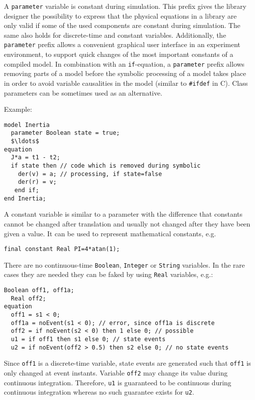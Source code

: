 \begin{nonnormative}
A \lstinline!parameter! variable is constant during simulation.
This prefix gives the library designer the possibility to express that the physical equations in a library are only valid if some of the used components are constant during simulation.
The same also holds for discrete-time and constant variables.
Additionally, the \lstinline!parameter! prefix allows a convenient graphical user interface in an experiment environment, to support quick changes of the most important constants of a compiled model.
In combination with an \lstinline!if!-equation, a \lstinline!parameter! prefix allows removing parts of a model before the symbolic processing of a model takes place in order to avoid variable causalities in the model (similar to \lstinline!#ifdef! in C).
Class parameters can be sometimes used as an alternative.

Example:
\begin{lstlisting}[language=modelica]
model Inertia
  parameter Boolean state = true;
  $\ldots$
equation
  J*a = t1 - t2;
  if state then // code which is removed during symbolic
    der(v) = a; // processing, if state=false
    der(r) = v;
   end if;
end Inertia;
\end{lstlisting}

A constant variable is similar to a parameter with the difference
that constants cannot be changed after translation and usually not
changed after they have been given a value. It can be used to represent
mathematical constants, e.g.
\begin{lstlisting}[language=modelica]
final constant Real PI=4*atan(1);
\end{lstlisting}

There are no continuous-time \lstinline!Boolean!, \lstinline!Integer! or \lstinline!String!
variables. In the rare cases they are needed they can be
faked by using \lstinline!Real! variables, e.g.:
\begin{lstlisting}[language=modelica]
  Boolean off1, off1a;
  Real off2;
equation
  off1 = s1 < 0;
  off1a = noEvent(s1 < 0); // error, since off1a is discrete
  off2 = if noEvent(s2 < 0) then 1 else 0; // possible
  u1 = if off1 then s1 else 0; // state events
  u2 = if noEvent(off2 > 0.5) then s2 else 0; // no state events
\end{lstlisting}

Since \lstinline!off1! is a discrete-time variable, state events are
generated such that \lstinline!off1! is only changed at event instants.
Variable \lstinline!off2! may change its value during continuous integration.
Therefore, \lstinline!u1! is guaranteed to be continuous during continuous
integration whereas no such guarantee exists for \lstinline!u2!.
\end{nonnormative}


